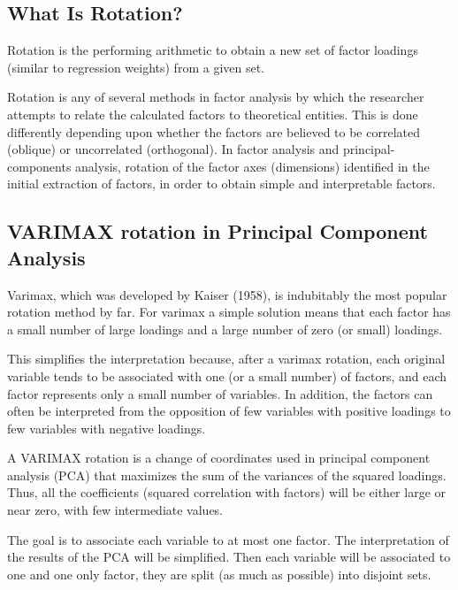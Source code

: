 \subsection{What Is Rotation?}
Rotation is the performing arithmetic to obtain a new set of factor loadings (similar to regression weights) from a given set.

Rotation is any of several methods in factor analysis by which the researcher attempts to relate the calculated factors to theoretical entities. This is done differently depending upon whether the factors are believed to be correlated (oblique) or uncorrelated
(orthogonal). In factor analysis and principal-components analysis, rotation of the factor axes
(dimensions) identified in the initial extraction of factors, in order to obtain simple and interpretable
factors.
\subsection{VARIMAX rotation in Principal Component Analysis}
Varimax, which was developed by Kaiser (1958), is indubitably the most
popular rotation method by far. For varimax a simple solution means that each
factor has a small number of large loadings and a large number of zero (or small)
loadings. 

This simplifies the interpretation because, after a varimax rotation,
each original variable tends to be associated with one (or a small number) of
factors, and each factor represents only a small number of variables. In addition,
the factors can often be interpreted from the opposition of few variables with
positive loadings to few variables with negative loadings.


A VARIMAX rotation is a change of coordinates used in principal component analysis (PCA) that maximizes the sum of the variances of the squared loadings. Thus, all the coefficients (squared correlation with factors) will be either large or near zero, with few intermediate values.

The goal is to associate each variable to at most one factor. The interpretation of the results of the PCA will be simplified. Then each variable will be associated to one and one only factor, they are split (as much as possible) into disjoint sets.

